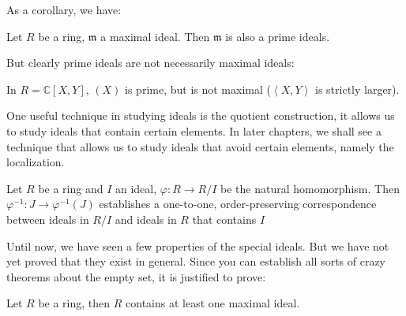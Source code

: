 \documentclass{note-eng}
\begin{document}
As a corollary, we have:

\begin{corollary}
    Let $R$ be a ring, $\mathfrak{m}$ a maximal ideal. Then $\mathfrak{m}$ is also a prime ideals.
\end{corollary}

But clearly prime ideals are not necessarily maximal ideals:

\begin{example}
    In $R = \mathbb{C}[X, Y]$, $(X)$ is prime, but is not maximal ($\left\langle X, Y \right\rangle$ is strictly larger).
\end{example}

One useful technique in studying ideals is the quotient construction, it allows us to study ideals that contain certain elements. In later chapters, we shall see a technique that allows us to study ideals that avoid certain elements, namely the localization.

\begin{proposition} \label{prop:quotient-correspondence}
    Let $R$ be a ring and $I$ an ideal, $\varphi: R \rightarrow R / I$ be the natural homomorphism. Then $\varphi ^{-1}: J \rightarrow \varphi ^{-1}(J)$ establishes a one-to-one, order-preserving correspondence between ideals in $R / I$ and ideals in $R$ that contains $I$
\end{proposition}

\iffalse
For irreducible ideals, we have:

\begin{proposition}
    Prime ideals are all irreducible ideals.
\end{proposition}

\begin{proof}
    Let $\mathfrak{p}$ be a prime ideal, suppose $\mathfrak{p} = I \cap J$, with $I, J \ne \mathfrak{p}$. Take $a \in I \setminus \mathfrak{p}, b \in J \setminus \mathfrak{p}$, we have $ab \in I \cap J = \mathfrak{p}$, but $a, b \notin \mathfrak{p}$, a contradiction.
\end{proof}

\fi

Until now, we have seen a few properties of the special ideals. But we have not yet proved that they exist in general. Since you can establish all sorts of crazy theorems about the empty set, it is justified to prove:

\begin{proposition} \label{prop:exist-maximal}
    Let $R$ be a ring, then $R$ contains at least one maximal ideal.
\end{proposition}
\end{document}
